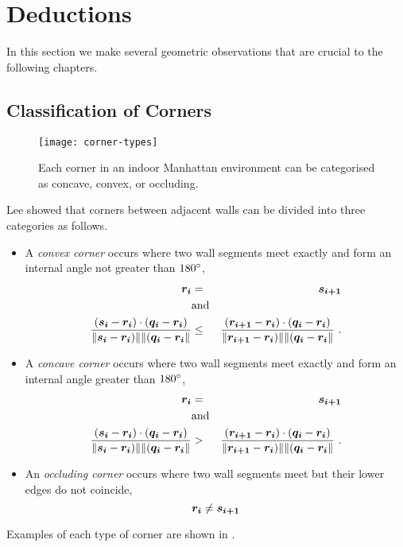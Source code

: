 \section{Deductions}
\label{sec:misc-geometry}

In this section we make several geometric observations that are
crucial to the following chapters.

\subsection{Classification of Corners}
\label{sec:corner-categories}

\begin{figure}[tb]%
  \centering
  \texttt{[image: corner-types]}
  \caption{Each corner in an indoor Manhattan environment can be
    categorised as concave, convex, or occluding.}
  \label{fig:corner-types}
\end{figure}

Lee \etal \cite{Lee09} showed that corners between adjacent walls
can be divided into three categories as follows.
\begin{itemize}
  \item{A \textit{convex corner} occurs where two wall segments meet
    exactly and form an internal angle not greater than $180\degrees$, \ie
    \begin{eqnarray}
      \vect{r_i} &=& \vect{s_{i+1}}\\
      &\mbox{and}&\\
      \frac{(\vect{s_i}-\vect{r_i})\cdot(\vect{q_i}-\vect{r_i})}
           {\|\vect{s_i}-\vect{r_i})\|\|(\vect{q_i}-\vect{r_i}\|}
      &\leq&
      \frac{(\vect{r_{i+1}}-\vect{r_i})\cdot(\vect{q_i}-\vect{r_i})}
           {\|\vect{r_{i+1}}-\vect{r_i})\|\|(\vect{q_i}-\vect{r_i}\|} ~.
    \end{eqnarray}
  }
  \item{A \textit{concave corner} occurs where two wall segments meet
    exactly and form an internal angle greater than $180\degrees$, \ie
    \begin{eqnarray}
      \vect{r_i} &=& \vect{s_{i+1}}\\
      &\mbox{and}&\\
      \frac{(\vect{s_i}-\vect{r_i})\cdot(\vect{q_i}-\vect{r_i})}
           {\|\vect{s_i}-\vect{r_i})\|\|(\vect{q_i}-\vect{r_i}\|}
      &>&
      \frac{(\vect{r_{i+1}}-\vect{r_i})\cdot(\vect{q_i}-\vect{r_i})}
           {\|\vect{r_{i+1}}-\vect{r_i})\|\|(\vect{q_i}-\vect{r_i}\|} ~.
    \end{eqnarray}
  }
  \item{An \textit{occluding corner} occurs where two wall segments
    meet but their lower edges do not coincide, \ie
    \begin{equation}
      \vect{r_i} \neq \vect{s_{i+1}}
    \end{equation}
  }
\end{itemize}
Examples of each type of corner are shown in .

